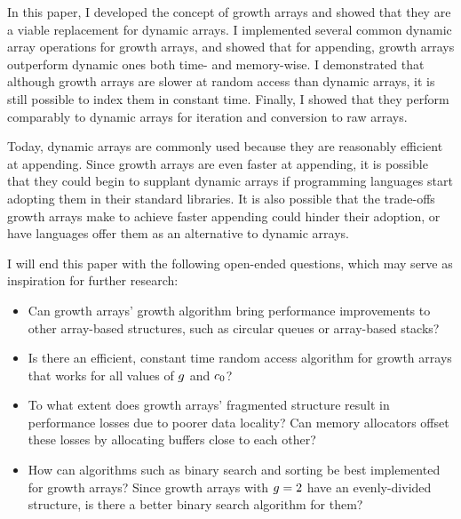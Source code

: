 In this paper, I developed the concept of growth arrays and showed that they are a viable replacement for dynamic arrays. I implemented several common dynamic array operations for growth arrays, and showed that for appending, growth arrays outperform dynamic ones both time- and memory-wise. I demonstrated that although growth arrays are slower at random access than dynamic arrays, it is still possible to index them in constant time. Finally, I showed that they perform comparably to dynamic arrays for iteration and conversion to raw arrays.

Today, dynamic arrays are commonly used because they are reasonably efficient at appending. Since growth arrays are even faster at appending, it is possible that they could begin to supplant dynamic arrays if programming languages start adopting them in their standard libraries. It is also possible that the trade-offs growth arrays make to achieve faster appending could hinder their adoption, or have languages offer them as an alternative to dynamic arrays.

I will end this paper with the following open-ended questions, which may serve as inspiration for further research:

\begin{itemize}
	\item Can growth arrays' growth algorithm bring performance improvements to other array-based structures, such as circular queues or array-based stacks?
	\item Is there an efficient, constant time random access algorithm for growth arrays that works for all values of $g$ and $c_0$?
	\item To what extent does growth arrays' fragmented structure result in performance losses due to poorer data locality? Can memory allocators offset these losses by allocating buffers close to each other?
	\item How can algorithms such as binary search and sorting be best implemented for growth arrays? Since growth arrays with $g = 2$ have an evenly-divided structure, is there a better binary search algorithm for them?
\end{itemize}
